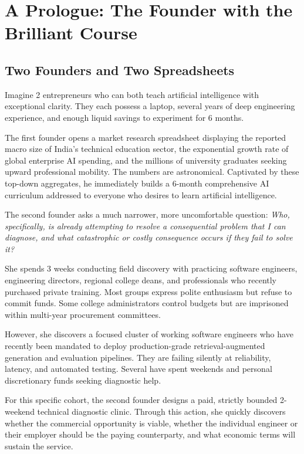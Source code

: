 \section{A Prologue: The Founder with the Brilliant Course}

\subsection{Two Founders and Two Spreadsheets}

Imagine 2 entrepreneurs who can both teach artificial intelligence with exceptional clarity. They each possess a laptop, several years of deep engineering experience, and enough liquid savings to experiment for 6 months.

The first founder opens a market research spreadsheet displaying the reported macro size of India's technical education sector, the exponential growth rate of global enterprise AI spending, and the millions of university graduates seeking upward professional mobility. The numbers are astronomical. Captivated by these top-down aggregates, he immediately builds a 6-month comprehensive AI curriculum addressed to everyone who desires to learn artificial intelligence.

The second founder asks a much narrower, more uncomfortable question: \textit{Who, specifically, is already attempting to resolve a consequential problem that I can diagnose, and what catastrophic or costly consequence occurs if they fail to solve it?}

She spends 3 weeks conducting field discovery with practicing software engineers, engineering directors, regional college deans, and professionals who recently purchased private training. Most groups express polite enthusiasm but refuse to commit funds. Some college administrators control budgets but are imprisoned within multi-year procurement committees.

However, she discovers a focused cluster of working software engineers who have recently been mandated to deploy production-grade retrieval-augmented generation and evaluation pipelines. They are failing silently at reliability, latency, and automated testing. Several have spent weekends and personal discretionary funds seeking diagnostic help.

For this specific cohort, the second founder designs a paid, strictly bounded 2-weekend technical diagnostic clinic. Through this action, she quickly discovers whether the commercial opportunity is viable, whether the individual engineer or their employer should be the paying counterparty, and what economic terms will sustain the service.

